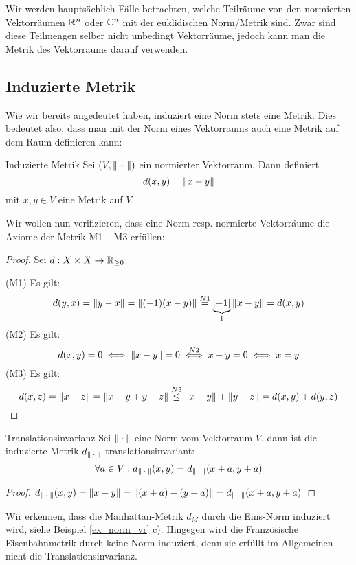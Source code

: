Wir werden hauptsächlich Fälle betrachten, welche Teilräume von den normierten Vektorräumen $\mathbb{R}^n$ oder $\mathbb{C}^n$ mit der euklidischen Norm/Metrik sind. Zwar sind diese Teilmengen selber nicht unbedingt Vektorräume, jedoch kann man die Metrik des Vektorraums darauf verwenden.

\subsection{Induzierte Metrik}

Wie wir bereits angedeutet haben, induziert eine Norm stets eine Metrik. Dies bedeutet also, dass man mit der Norm eines Vektorraums auch eine Metrik auf dem Raum definieren kann:

\begin{satz}{Induzierte Metrik}{}
Sei $(V, \left\|\ \cdot \ \right\|)$ ein normierter Vektorraum. Dann definiert
$$d(x,y) = \left\|x - y\right\|$$
mit $x,y \in V$ eine Metrik auf $V$.
\end{satz}
Wir wollen nun verifizieren, dass eine Norm resp. normierte Vektorräume die Axiome der Metrik M1 -- M3 erfüllen: 
\begin{proof} Sei $d: X \times X \to \mathbb{R}_{\geq 0}$

(M1) Es gilt: 
$$d(y,x) = \left\|y-x\right\| = \left\|(-1)(x-y)\right\| \stackrel{N1}{=} \underbrace{\left|-1\right|}_{1} \left\|x-y\right\| = d(x,y)$$
(M2) Es gilt:
$$d(x,y) = 0 \iff \left\|x-y\right\|=0 \stackrel{N2}{\iff} x-y = 0 \iff x= y$$
(M3) Es gilt:
$$d(x,z) = \left\|x-z\right\| = \left\|x-y+y-z\right\| \stackrel{N3}{\leq} \left\|x-y\right\| + \left\|y-z\right\| = d(x,y) + d(y,z)$$
\end{proof}

\begin{lemma}{Translationsinvarianz}{}
Sei $\left\|\:\cdot\:\right\|$ eine Norm vom Vektorraum $V$, dann ist die induzierte Metrik $d_{\left\|\:\cdot\:\right\|}$ translationsinvariant:
$$\forall a \in V: d_{\left\|\:\cdot\:\right\|}(x,y)=d_{\left\|\:\cdot\:\right\|}(x+a,y+a)$$
\end{lemma}
\begin{proof}
$d_{\left\|\:\cdot\:\right\|}(x,y) = \left\|x-y\right\| = \left\|(x+a)-(y+a)\right\|=d_{\left\|\:\cdot\:\right\|}(x+a,y+a)$
\end{proof}

\begin{remark}
Wir erkennen, dass die Manhattan-Metrik $d_M$ durch die Eins-Norm induziert wird, siehe Beispiel \ref{ex_norm_vr} c). Hingegen wird die Französische Eisenbahnmetrik durch keine Norm induziert, denn sie erfüllt im Allgemeinen nicht die Translationsinvarianz.
\end{remark}


